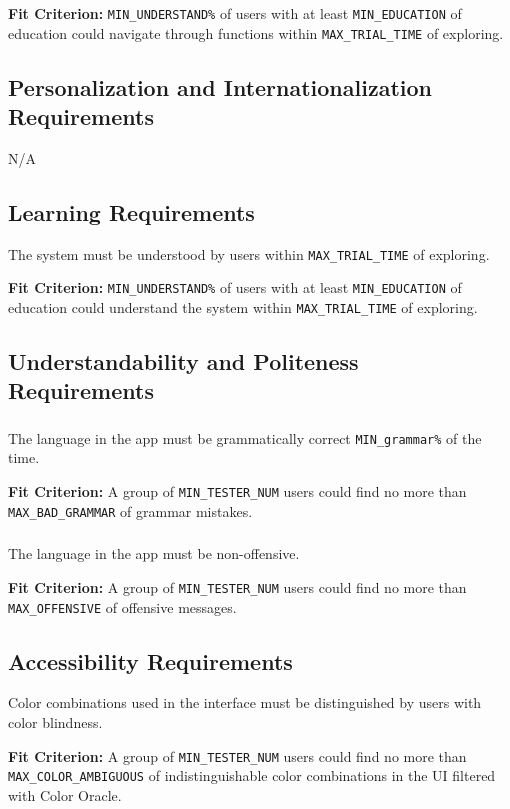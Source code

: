 \documentclass[12pt]{article}
\begin{document}
\textbf{Fit Criterion:} \texttt{MIN\_UNDERSTAND\%} of users with at least \texttt{MIN\_EDUCATION} of education could navigate through functions within \texttt{MAX\_TRIAL\_TIME} of exploring.

\subsection{Personalization and Internationalization Requirements}
N/A
\subsection{Learning Requirements}
The system must be understood by users within \texttt{MAX\_TRIAL\_TIME} of exploring.

\textbf{Fit Criterion:} \texttt{MIN\_UNDERSTAND\%} of users with at least \texttt{MIN\_EDUCATION} of education could understand the system within \texttt{MAX\_TRIAL\_TIME} of exploring.
\subsection{Understandability and Politeness Requirements}
\subsubsection{}
The language in the app must be grammatically correct \texttt{MIN\_grammar\%} of the time.

\textbf{Fit Criterion:} A group of \texttt{MIN\_TESTER\_NUM}  users could find no more than \texttt{MAX\_BAD\_GRAMMAR} of grammar mistakes.

\subsubsection{}
The language in the app must be non-offensive.

\textbf{Fit Criterion:} A group of \texttt{MIN\_TESTER\_NUM} users could find no more than \texttt{MAX\_OFFENSIVE} of offensive messages.
\subsection{Accessibility Requirements}
Color combinations used in the interface must be distinguished by users with color blindness.

\textbf{Fit Criterion:} A group of \texttt{MIN\_TESTER\_NUM} users could find no more than \texttt{MAX\_COLOR\_AMBIGUOUS} of indistinguishable color combinations in the UI filtered with Color Oracle.
\end{document}
